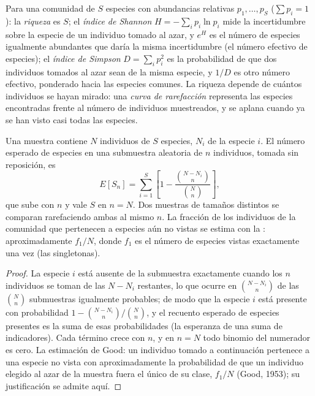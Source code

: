 \begin{definition}[Diversidad]\label{def:b3:microbiomes:diversity}
Para una comunidad de $S$ especies con abundancias relativas $p_{1},\dots,
p_{S}$ ($\sum p_{i} = 1$): la \emph{riqueza} es $S$; el \emph{índice de
Shannon} $H = -\sum_{i} p_{i}\ln p_{i}$ mide la incertidumbre sobre la
especie de un individuo tomado al azar, y $e^{H}$ es el número de
especies igualmente abundantes que daría la misma incertidumbre (el
número efectivo de especies); el \emph{índice de Simpson}
$D = \sum_{i} p_{i}^{2}$ es la probabilidad de que dos individuos tomados
al azar sean de la misma especie, y $1/D$ es otro número efectivo,
ponderado hacia las especies comunes. La riqueza depende de cuántos
individuos se hayan mirado: una \emph{curva de rarefacción} representa
las especies encontradas frente al número de individuos muestreados, y se
aplana cuando ya se han visto casi todas las especies.
\end{definition}

\begin{theorem}[Rarefacción]\label{thm:b3:microbiomes:rarefaction}
Una muestra contiene $N$ individuos de $S$ especies, $N_{i}$ de la
especie $i$. El número esperado de especies en una submuestra aleatoria
de $n$ individuos, tomada sin reposición, es
\[
E[S_{n}] = \sum_{i=1}^{S}\left[1 - \frac{\binom{N - N_{i}}{n}}
{\binom{N}{n}}\right],
\]
que sube con $n$ y vale $S$ en $n = N$. Dos muestras de tamaños distintos
se comparan rarefaciendo ambas al mismo $n$. La fracción de los
individuos de la comunidad que pertenecen a especies aún no vistas se
estima con la \emph{}: aproximadamente $f_{1}/N$, donde
$f_{1}$ es el número de especies vistas exactamente una vez (las
singletonas).
\end{theorem}
\begin{proof}
La especie $i$ está ausente de la submuestra exactamente cuando los $n$
individuos se toman de las $N - N_{i}$ restantes, lo que ocurre en
$\binom{N - N_{i}}{n}$ de las $\binom{N}{n}$ submuestras igualmente
probables; de modo que la especie $i$ está presente con probabilidad
$1 - \binom{N-N_{i}}{n}/
\binom{N}{n}$, y el recuento esperado de especies presentes es la suma de
esas probabilidades (la esperanza de una suma de indicadores). Cada
término crece con $n$, y en $n = N$ todo binomio del numerador es cero.
La estimación de Good: un individuo tomado a continuación pertenece a una
especie no vista con aproximadamente la probabilidad de que un individuo
elegido al azar de la muestra fuera el único de su clase, $f_{1}/N$
(Good, 1953); su justificación se admite aquí.
\end{proof}

